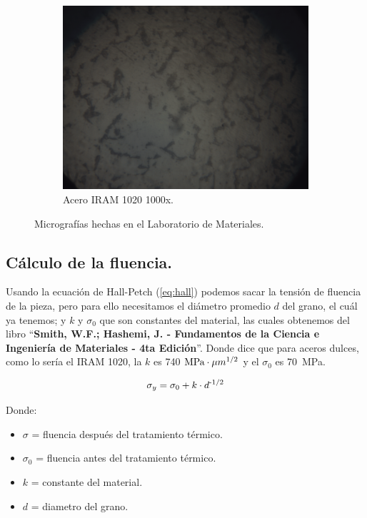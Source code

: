 \documentclass[12pt,a4paper]{article}
\begin{document}
\begin{figure}[h!]
    \begin{subfigure}[b]{0.6\linewidth}
        \centering
        \includegraphics[width=\linewidth]{Figuras/Del-Rio_8.png}
        \caption{Acero IRAM 1020 1000x.}
        \label{1000x}
    \end{subfigure}
    \caption{Micrografías hechas en el Laboratorio de Materiales.}
    \label{fig:metalografia}
\end{figure}

\subsection{Cálculo de la fluencia.}

Usando la ecuación de Hall-Petch (\autoref{eq:hall}) podemos sacar la tensión de fluencia de la pieza, pero para ello necesitamos el diámetro promedio $d$ del grano, el cuál ya tenemos; y $k$ y $\sigma_0$ que son constantes del material, las cuales obtenemos del libro \enquote{\textbf{Smith, W.F.; Hashemi, J. - Fundamentos de la Ciencia e Ingeniería de Materiales - 4ta Edición}}. Donde dice que para aceros dulces, como lo sería el IRAM 1020, la $k$ es 740 $\text{MPa}\cdot \mu m\textsuperscript{1/2}$ y el $\sigma_0$ es \SI{70}{\mega\pascal}.

\begin{equation}
    \sigma_y = \sigma_0 +k\cdot d \textsuperscript{-1/2}
    \label{eq:hall}
\end{equation}

Donde:
\begin{itemize}
    \item $\sigma$ = fluencia después del tratamiento térmico.
    \item $\sigma_0$ = fluencia antes del tratamiento térmico.
    \item $k$ = constante del material.
    \item $d$ = diametro del grano.
\end{itemize}
\end{document}
